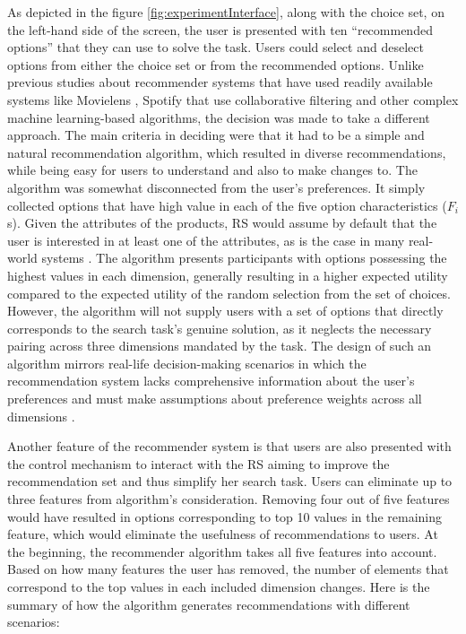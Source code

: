 \documentclass[a4paper,12pt]{article}
\begin{document}
As depicted in the figure \ref{fig:experimentInterface}, along with the choice set, on the left-hand side of the screen, the user is presented with ten ``recommended options'' that they can use to solve the task. Users could select and deselect options from either the choice set or from the recommended options. Unlike previous studies about recommender systems that have used readily available systems like Movielens \citep{movielens2018}, Spotify \citep{millecampControllingSpotifyRecommendations2018} that use collaborative filtering and other complex machine learning-based algorithms, the decision was made to take a different approach. The main criteria in deciding were that it had to be a simple and natural recommendation algorithm, which resulted in diverse recommendations, while being easy for users to understand and also to make changes to. The algorithm was somewhat disconnected from the user's preferences. It simply collected options that have high value in each of the five option characteristics ($F_i$s). Given the attributes of the products, RS would assume by default that the user is interested in at least one of the attributes, as is the case in many real-world systems \citep{guAddressingColdStartProblem2019}. The algorithm presents participants with options possessing the highest values in each dimension, generally resulting in a higher expected utility compared to the expected utility of the random selection from the set of choices. However, the algorithm will not supply users with a set of options that directly corresponds to the search task's genuine solution, as it neglects the necessary pairing across three dimensions mandated by the task. The design of such an algorithm mirrors real-life decision-making scenarios in which the recommendation system lacks comprehensive information about the user's preferences and must make assumptions about preference weights across all dimensions \citep{scheinMethodsMetricsColdStart}.

Another feature of the recommender system is that users are also presented with the control mechanism to interact with the RS aiming to improve the recommendation set and thus simplify her search task. Users can eliminate up to three features from algorithm's consideration. Removing four out of five features would have resulted in options corresponding to top 10 values in the remaining feature, which would eliminate the usefulness of recommendations to users. At the beginning, the recommender algorithm takes all five features into account. Based on how many features the user has removed, the number of elements that correspond to the top values in each included dimension changes. Here is the summary of how the algorithm generates recommendations with different scenarios:
\end{document}
